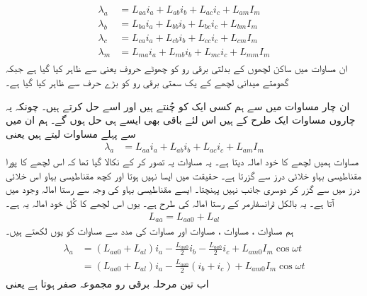 \begin{gather}
\begin{aligned}
\lambda_a&=L_{aa} i_a+L_{ab} i_b +L_{ac} i_c+L_{am} I_m\\
\lambda_b&=L_{ba} i_a+L_{bb} i_b +L_{bc} i_c+L_{bm} I_m\\
\lambda_c&=L_{ca} i_a+L_{cb} i_b +L_{cc} i_c+L_{cm} I_m\\
\lambda_m&=L_{ma} i_a+L_{mb} i_b +L_{mc} i_c+L_{mm} I_m
\end{aligned}
\end{gather}
ان مساوات میں ساکن لچھوں کے بدلتی برقی رو  کو چھوٹے حروف یعنی  سے ظاہر کیا گیا ہے جبکہ گھومتے میدانی لچھے کے یک سمتی برقی رو کو بڑے حرف   سے ظاہر کیا گیا ہے۔

ان چار مساوات میں سے ہم کسی ایک کو چُنتے ہیں اور اسے حل کرتے ہیں۔ چونکہ یہ چاروں مساوات ایک طرح کے ہیں اس لئے باقی بھی ایسے ہی حل ہوں گے۔ ہم ان میں سے پہلے مساوات لیتے ہیں یعنی
\begin{align}\label{مساوات_معاصر_ارتباط_الف_کل}
\lambda_a&=L_{aa} i_a+L_{ab} i_b +L_{ac} i_c+L_{am} I_m
\end{align}
 مساوات   ہمیں   لچھے کا خود امالہ دیتا ہے۔ یہ مساوات یہ تصور کر کے نکالا گیا تھا کہ اس لچھے کا پورا مقناطیسی بہاو خلائی درز سے گزرتا ہے۔ حقیقت میں ایسا نہیں ہوتا اور کچھ مقناطیسی بہاو اس خلائی درز میں سے گزر کر دوسری جانب نہیں پہنچتا۔ ایسے مقناطیسی بہاو کی وجہ سے رستا امالہ   وجود میں آتا ہے۔ یہ بالکل ٹرانسفارمر کے رستا امالہ کی طرح ہے۔ یوں اس لچھے کا کُل خود امالہ   یہ ہے۔
\begin{align}\label{مساوات_معاصر_الف_خود_کل_امالہ}
L_{aa}=L_{aa0}+L_{al}
\end{align}
ہم مساوات ،  مساوات ،  مساوات   اور مساوات   کی مدد سے مساوات   کو یوں لکھتے ہیں۔
\begin{gather}
\begin{aligned}\label{مساوات_معاصر_ارتباط_الف}
\lambda_a&=\left(L_{aa0}+L_{al} \right)i_a-\frac{L_{aa0}}{2} i_b -\frac{L_{aa0}}{2} i_c+L_{am0} I_m \cos \omega t \\
&=\left(L_{aa0}+L_{al} \right)i_a-\frac{L_{aa0}}{2} \left( i_b+i_c \right)+L_{am0} I_m \cos \omega t
\end{aligned}
\end{gather}
اب تین مرحلہ برقی رو مجموعہ صفر ہوتا ہے یعنی 
